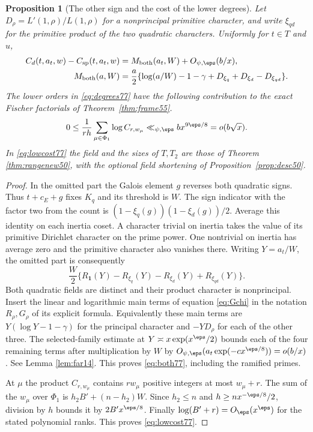 \documentclass[a4paper,11pt]{article}
\newtheorem{proposition}{Proposition}[section]
\theoremstyle{definition}
\theoremstyle{remark}
\numberwithin{equation}{section}
\begin{document}
\begin{proposition}[The other sign and the cost of the lower degrees]
\label{prop:others77}
Let \(D_\rho=L'(1,\rho)/L(1,\rho)\) for a nonprincipal primitive
character, and write \(\xi_{qd}\) for the primitive product of
the two quadratic characters. Uniformly for \(t\in T\) and \(u\),
\begin{align}
 C_d(t,a_t,w)-C_{\rm sp}(t,a_t,w)
  &= M_{\rm both}(a_t,W)+O_{\psi,\eps}(b/x),\notag\\
 M_{\rm both}(a,W)
  &=\frac{a}{2}
     \{\log(a/W)-1-\gamma+D_{\xi_q}+D_{\xi_d}-D_{\xi_{qd}}\}.
                                                        \label{eq:both77}
\end{align}
The lower orders in \eqref{eq:degrees77} have the following
contribution to the exact Fischer factorials of
Theorem~\ref{thm:frame55}.
\begin{equation}
  0\le\frac{1}{rh}\sum_{\mu\in\Phi_1}\log C_{r,w_\mu}
           \ll_{\psi,\eps} b x^{9\eps/8}=o(b\sqrt x).
                                                        \label{eq:lowcost77}
\end{equation}
In \eqref{eq:lowcost77} the field and the sizes of \(T,T_2\)
are those of Theorem \ref{thm:rangenew50}, with the optional field
shortening of Proposition~\ref{prop:desc50}.
\end{proposition}
\begin{proof}
In the omitted part the Galois element \(g\) reverses both
quadratic signs. Thus \(t+c_E+g\) fixes \(K_q\) and its threshold
is \(W\). The sign indicator with the factor two from the count is
\((1-\xi_q(g))(1-\xi_d(g))/2\). Average this identity on each
inertia coset. A character trivial on inertia takes the value
of its primitive Dirichlet character on the prime power. One
nontrivial on inertia has average zero and the primitive
character also vanishes there. Writing \(Y=a_t/W\), the
omitted part is consequently
\[
       \frac W2\{R_{\mathbf1}(Y)-R_{\xi_q}(Y)
                         -R_{\xi_d}(Y)+R_{\xi_{qd}}(Y)\}.
\]
Both quadratic fields are distinct and their product character
is nonprincipal. Insert the linear and logarithmic main terms
of equation \ref{eq:Gchi} in the notation \(R_\rho,G_\rho\)
of its explicit formula. Equivalently these main terms are
\(Y(\log Y-1-\gamma)\) for the principal character and
\(-YD_\rho\) for each of the other three. The selected-family
estimate at \(Y\asymp x\exp(x^\eps/2)\) bounds each of the four
remaining terms after multiplication by \(W\) by
\(O_{\psi,\eps}(a_t\exp(-c x^{\eps/8}))=o(b/x)\).
See Lemma \ref{lem:far14}.
This proves \eqref{eq:both77}, including the ramified primes.

At \(\mu\) the product \(C_{r,w_\mu}\) contains \(r w_\mu\)
positive integers at most \(w_\mu+r\). The sum of the \(w_\mu\)
over \(\Phi_1\) is \(h_2 B'+(n-h_2)W\). Since \(h_2\le n\)
and \(h\ge n x^{-\eps/8}/2\), division by \(h\) bounds it
by \(2B'x^{\eps/8}\). Finally \(\log(B'+r)=O_\eps(x^\eps)\)
for the stated polynomial ranks. This proves \eqref{eq:lowcost77}.
\end{proof}
\end{document}
